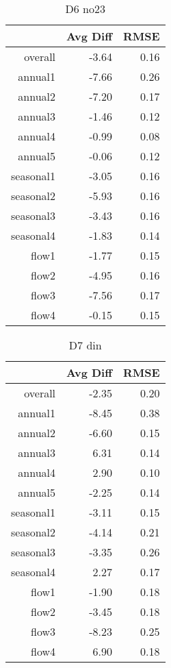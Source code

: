 \begin{table}[H]
\centering
\begin{tabular}{rrr}
  \hline
 & Avg Diff & RMSE \\ 
  \hline
overall & -3.64 & 0.16 \\ 
  annual1 & -7.66 & 0.26 \\ 
  annual2 & -7.20 & 0.17 \\ 
  annual3 & -1.46 & 0.12 \\ 
  annual4 & -0.99 & 0.08 \\ 
  annual5 & -0.06 & 0.12 \\ 
  seasonal1 & -3.05 & 0.16 \\ 
  seasonal2 & -5.93 & 0.16 \\ 
  seasonal3 & -3.43 & 0.16 \\ 
  seasonal4 & -1.83 & 0.14 \\ 
  flow1 & -1.77 & 0.15 \\ 
  flow2 & -4.95 & 0.16 \\ 
  flow3 & -7.56 & 0.17 \\ 
  flow4 & -0.15 & 0.15 \\ 
   \hline
\end{tabular}
\caption{D6 no23} 
\end{table}
\begin{table}[H]
\centering
\begin{tabular}{rrr}
  \hline
 & Avg Diff & RMSE \\ 
  \hline
overall & -2.35 & 0.20 \\ 
  annual1 & -8.45 & 0.38 \\ 
  annual2 & -6.60 & 0.15 \\ 
  annual3 & 6.31 & 0.14 \\ 
  annual4 & 2.90 & 0.10 \\ 
  annual5 & -2.25 & 0.14 \\ 
  seasonal1 & -3.11 & 0.15 \\ 
  seasonal2 & -4.14 & 0.21 \\ 
  seasonal3 & -3.35 & 0.26 \\ 
  seasonal4 & 2.27 & 0.17 \\ 
  flow1 & -1.90 & 0.18 \\ 
  flow2 & -3.45 & 0.18 \\ 
  flow3 & -8.23 & 0.25 \\ 
  flow4 & 6.90 & 0.18 \\ 
   \hline
\end{tabular}
\caption{D7 din} 
\end{table}
